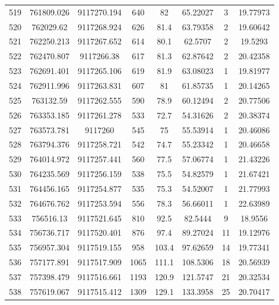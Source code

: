 \begin{longtable}{cccccccc}
519  & 761809.026      & 9117270.194      & 640     & 82    & 65.22027 & 3  & 19.77973 \\
520  & 762029.62       & 9117268.924      & 626     & 81.4  & 63.79358 & 2  & 19.60642 \\
521  & 762250.213      & 9117267.652      & 614     & 80.1  & 62.5707  & 2  & 19.5293  \\
522  & 762470.807      & 9117266.38       & 617     & 81.3  & 62.87642 & 2  & 20.42358 \\
523  & 762691.401      & 9117265.106      & 619     & 81.9  & 63.08023 & 1  & 19.81977 \\
524  & 762911.996      & 9117263.831      & 607     & 81    & 61.85735 & 1  & 20.14265 \\
525  & 763132.59       & 9117262.555      & 590     & 78.9  & 60.12494 & 2  & 20.77506 \\
526  & 763353.185      & 9117261.278      & 533     & 72.7  & 54.31626 & 2  & 20.38374 \\
527  & 763573.781      & 9117260          & 545     & 75    & 55.53914 & 1  & 20.46086 \\
528  & 763794.376      & 9117258.721      & 542     & 74.7  & 55.23342 & 1  & 20.46658 \\
529  & 764014.972      & 9117257.441      & 560     & 77.5  & 57.06774 & 1  & 21.43226 \\
530  & 764235.569      & 9117256.159      & 538     & 75.5  & 54.82579 & 1  & 21.67421 \\
531  & 764456.165      & 9117254.877      & 535     & 75.3  & 54.52007 & 1  & 21.77993 \\
532  & 764676.762      & 9117253.594      & 556     & 78.3  & 56.66011 & 1  & 22.63989 \\
533  & 756516.13       & 9117521.645      & 810     & 92.5  & 82.5444  & 9  & 18.9556  \\
534  & 756736.717      & 9117520.401      & 876     & 97.4  & 89.27024 & 11 & 19.12976 \\
535  & 756957.304      & 9117519.155      & 958     & 103.4 & 97.62659 & 14 & 19.77341 \\
536  & 757177.891      & 9117517.909      & 1065    & 111.1 & 108.5306 & 18 & 20.56939 \\
537  & 757398.479      & 9117516.661      & 1193    & 120.9 & 121.5747 & 21 & 20.32534 \\
538  & 757619.067      & 9117515.412      & 1309    & 129.1 & 133.3958 & 25 & 20.70417 \\

\end{longtable}
